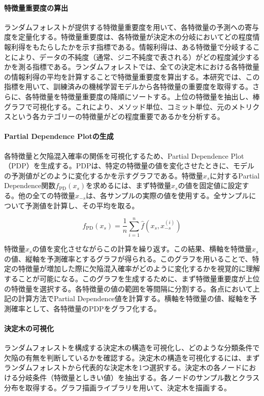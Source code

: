 \paragraph{特徴量重要度の算出}
ランダムフォレストが提供する特徴量重要度を用いて、各特徴量の予測への寄与度を定量化する。特徴量重要度は、各特徴量が決定木の分岐においてどの程度情報利得をもたらしたかを示す指標である。情報利得は、ある特徴量で分岐することにより、データの不純度（通常、ジニ不純度で表される）がどの程度減少するかを測る指標である。ランダムフォレストでは、全ての決定木における各特徴量の情報利得の平均を計算することで特徴量重要度を算出する。本研究では、この指標を用いて、訓練済みの機械学習モデルから各特徴量の重要度を取得する。さらに、各特徴量を特徴量重要度の降順にソートする。上位の特徴量を抽出し、棒グラフで可視化する。これにより、メソッド単位、コミット単位、元のメトリクスという各カテゴリーの特徴量がどの程度重要であるかを分析する。

\paragraph{Partial Dependence Plotの生成}
各特徴量と欠陥混入確率の関係を可視化するため、Partial Dependence Plot（PDP）を生成する。PDPは、特定の特徴量の値を変化させたときに、モデルの予測値がどのように変化するかを示すグラフである。特徴量$x_s$に対するPartial Dependence関数$f_{\text{PD}}(x_s)$を求めるには、まず特徴量$x_s$の値を固定値に設定する。他の全ての特徴量$x_{-s}$は、各サンプルの実際の値を使用する。全サンプルについて予測値を計算し、その平均を取る。

\[
f_{\text{PD}}(x_s) = \frac{1}{n}\sum_{i=1}^{n}\hat{f}(x_s, x_{-s}^{(i)})
\]

特徴量$x_s$の値を変化させながらこの計算を繰り返す。この結果、横軸を特徴量$x_s$の値、縦軸を予測確率とするグラフが得られる。このグラフを用いることで、特定の特徴量が増加した際に欠陥混入確率がどのように変化するかを視覚的に理解することが可能になる。このグラフを生成するために、まず特徴量重要度が上位の特徴量を選択する。各特徴量の値の範囲を等間隔に分割する。各点において上記の計算方法でPartial Dependence値を計算する。横軸を特徴量の値、縦軸を予測確率として、各特徴量のPDPをグラフ化する。

\paragraph{決定木の可視化}
ランダムフォレストを構成する決定木の構造を可視化し、どのような分類条件で欠陥の有無を判断しているかを確認する。決定木の構造を可視化するには、まずランダムフォレストから代表的な決定木を1つ選択する。決定木の各ノードにおける分岐条件（特徴量としきい値）を抽出する。各ノードのサンプル数とクラス分布を取得する。グラフ描画ライブラリを用いて、決定木を描画する。
